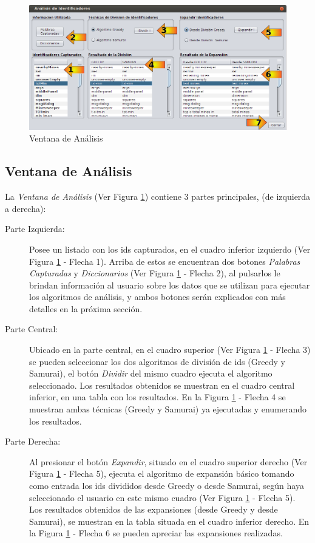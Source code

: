 \begin{figure}[h!] %
\centerline{%
\includegraphics[scale= 0.52]{./cap4/ida_06.png}
}
\caption{Ventana de Análisis}
\label{ida6}
\end{figure}

\subsection{Ventana de Análisis}

La \textit{Ventana de Análisis} (Ver Figura \ref{ida6}) contiene 3 partes principales, (de izquierda a derecha):

\begin{description}

\item[Parte Izquierda:] Posee un listado con los ids capturados, en el cuadro inferior izquierdo (Ver Figura \ref{ida6} - Flecha 1). Arriba de estos se encuentran dos botones \textit{Palabras Capturadas} y \textit{Diccionarios} (Ver Figura \ref{ida6} - Flecha 2), al pulsarlos le brindan información al usuario sobre los datos que se utilizan para ejecutar los algoritmos de análisis, y ambos botones serán explicados con más detalles en la próxima sección.

\item[Parte Central:] Ubicado en la parte central, en el cuadro superior (Ver Figura \ref{ida6} - Flecha 3) se pueden seleccionar los dos algoritmos de división de ids (Greedy y Samurai), el botón \textit{Dividir} del mismo cuadro ejecuta el algoritmo seleccionado. Los resultados obtenidos se muestran en el cuadro central inferior, en una tabla con los resultados. En la Figura \ref{ida6} - Flecha 4 se muestran ambas técnicas (Greedy y Samurai) ya ejecutadas y enumerando los resultados.

\item[Parte Derecha:] Al presionar el botón \textit{Expandir}, situado en el cuadro superior derecho (Ver Figura \ref{ida6} - Flecha 5), ejecuta el algoritmo de expansión básico tomando como entrada los ids divididos desde Greedy o desde Samurai, según haya seleccionado el usuario en este mismo cuadro (Ver Figura \ref{ida6} - Flecha 5). Los resultados obtenidos de las expansiones (desde Greedy y desde Samurai), se muestran en la tabla situada en el cuadro inferior derecho. En la Figura \ref{ida6} - Flecha 6 se pueden apreciar las expansiones realizadas.

\end{description}

